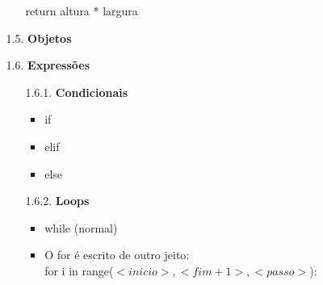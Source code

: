 \documentclass[12pt, a4paper]{article} %
\begin{document}
\begin{enumerate}
\begin{enumerate}
\begin{itemize}
\setlength{\parindent}{1cm} return altura * largura
\end{itemize}
\item[1.5.] \textbf{Objetos}

\item[1.6.] \textbf{Expressões}
\begin{enumerate}
\item[1.6.1.] \textbf{Condicionais}
\begin{itemize}
\item if
\item elif
\item else
\end{itemize}
\item[1.6.2.] \textbf{Loops}
\begin{itemize}
\item while (normal)
\item O for é escrito de outro jeito:\\
for i in range($<inicio>, <fim+1>, <passo>$):\\[-0.5cm]


\end{itemize}
\end{enumerate}
\end{enumerate}
\end{enumerate}
\end{document}
